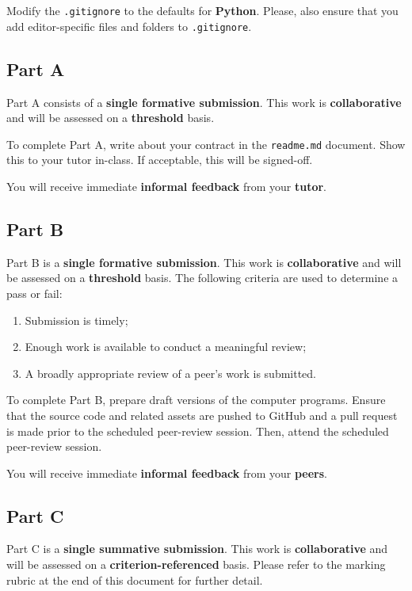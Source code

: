 \documentclass{../fal_assignment}
\begin{document}
Modify the \texttt{.gitignore} to the defaults for \textbf{Python}. Please, also ensure that you add editor-specific files and folders to \texttt{.gitignore}. 

\subsection*{Part A}

Part A consists of a \textbf{single formative submission}. This work is \textbf{collaborative} and will be assessed on a \textbf{threshold} basis. 

To complete Part A, write about your contract in the \texttt{readme.md} document.  Show this to your tutor in-class.  If acceptable, this will be signed-off. 

You will receive immediate \textbf{informal feedback} from your \textbf{tutor}.

\subsection*{Part B}

Part B is a \textbf{single formative submission}. This work is \textbf{collaborative} and will be assessed on a \textbf{threshold} basis. The following criteria are used to determine a pass or fail:

\begin{enumerate}[label=(\alph*)]
	\item Submission is timely;
	\item Enough work is available to conduct a meaningful review;
	\item A broadly appropriate review of a peer's work is submitted.
\end{enumerate}

To complete Part B, prepare draft versions of the computer programs. Ensure that the source code and related assets are pushed to GitHub and a pull request is made prior to the scheduled peer-review session. Then, attend the scheduled peer-review session.

You will receive immediate \textbf{informal feedback} from your \textbf{peers}.

\subsection*{Part C}

Part C is a \textbf{single summative submission}. This work is \textbf{collaborative} and will be assessed on a \textbf{criterion-referenced} basis. Please refer to the marking rubric at the end of this document for further detail.
\end{document}
